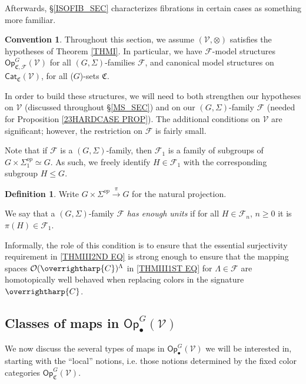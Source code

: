 \documentclass[a4paper,10pt
,draft
]{article}%
\numberwithin{equation}{section}
\numberwithin{figure}{section}
\theoremstyle{definition} %
\newtheorem{definition}[equation]{Definition}%
\newtheorem{convention}[equation]{Convention}%
\newcommand{\vect}[1]{\text{\overrightharp{\ensuremath{#1}}}}
\newcommand{\Cat}{\mathsf{Cat}}
\newcommand{\Op}{\mathsf{Op}}%
\newcommand{\F}{\ensuremath{\mathcal F}}
\newcommand{\V}{\ensuremath{\mathcal V}}
\renewcommand{\O}{\ensuremath{\mathcal O}}
\newcommand{\1}{\ensuremath{\mathbbm 1}}%
\begin{document}
Afterwards, \S \ref{ISOFIB_SEC} characterizes fibrations in certain cases as something more familiar. 



\begin{convention}
      Throughout this section, we assume $(\V, \otimes)$ satisfies the hypotheses of Theorem \ref{THMI}.
      In particular, we have $\F$-model structures $\Op^G_{\mathfrak C, \F}(\V)$ for all $(G,\Sigma)$-families $\F$,
      and canonical model structures on $\Cat_{\mathfrak C}(\V)$,
      for all ($G$)-sets $\mathfrak C$.
\end{convention}

In order to build these structures, we will need to both strengthen our hypotheses on $\V$ (discussed throughout \S \ref{MS_SEC})
and on our $(G,\Sigma)$-family $\F$ (needed for Proposition \ref{23HARDCASE PROP}).
The additional conditions on $\V$ are significant;
however, the restriction on $\F$ is fairly small.




Note that if $\mathcal{F}$ is a 
$(G,\Sigma)$-family, then 
$\mathcal{F_1}$ is a family of subgroups of 
$G \times \Sigma_1^{op} \simeq G$.
As such, we freely identify 
$H \in \F_1$ with the corresponding subgroup $H\leq G$.

\begin{definition}\label{FAMRESUNI DEF}
Write $G \times \Sigma^{op} \xrightarrow{\pi} 
G$
for the natural projection.

We say that a $(G,\Sigma)$-family $\F$ 
\emph{has enough units}
if for all $H \in \F_n$, $n\geq 0$
it is $\pi(H) \in \F_1$.
\end{definition}


Informally, the role of this condition 
is to ensure that the essential surjectivity requirement in 
\eqref{THMIII2ND EQ} is strong enough
to ensure that the mapping spaces
$\O(\vect{C})^{\Lambda}$ in \eqref{THMIII1ST EQ}
for $\Lambda \in \F$
are homotopically well behaved when replacing colors 
in the signature $\vect{C}$. 





\subsection{Classes of maps in $\mathsf{Op}^G_\bullet(\V)$}
\label{MAPSOPG_SEC}


We now discuss the several types of maps in 
$\mathsf{Op}^G_\bullet(\V)$ we will be interested in,
starting with the ``local'' notions, 
i.e. those notions determined by the fixed color categories $\mathsf{Op}_{\mathfrak{C}}^G(\V)$.
\end{document}
